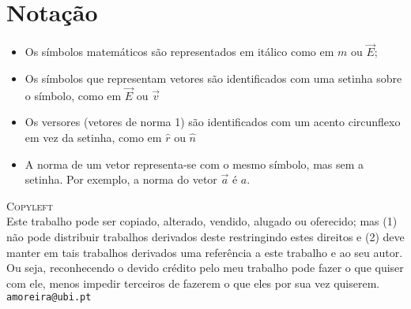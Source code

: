 \section*{Notação}
\begin{itemize}
\item
    Os símbolos matemáticos são representados em itálico como em $m$ ou $\vec
    E$;
\item
    Os símbolos que representam vetores são identificados com uma setinha sobre
    o símbolo, como em $\vec E$ ou $\vec v$
\item
    Os versores (vetores de norma 1) são identificados com um acento circunflexo
    em vez da setinha, como em $\hat r$ ou $\hat n$
\item
    A norma de um vetor representa-se com o mesmo símbolo, mas sem a setinha.
    Por exemplo, a norma do vetor $\vec a$ é $a$. 
\end{itemize}

\vfill
\noindent
{\small
\textsc{Copyleft}\\
Este trabalho pode ser copiado, alterado, vendido, alugado ou oferecido; mas (1)
não pode distribuir trabalhos derivados deste restringindo estes direitos e
(2) deve manter em tais trabalhos derivados uma referência a este trabalho e ao
seu autor. Ou seja, reconhecendo o devido crédito pelo meu trabalho pode fazer
o que quiser com ele, menos impedir terceiros de fazerem o que eles por sua vez
quiserem.\\
\texttt{amoreira@ubi.pt}
}

\pagebreak
\tableofcontents
